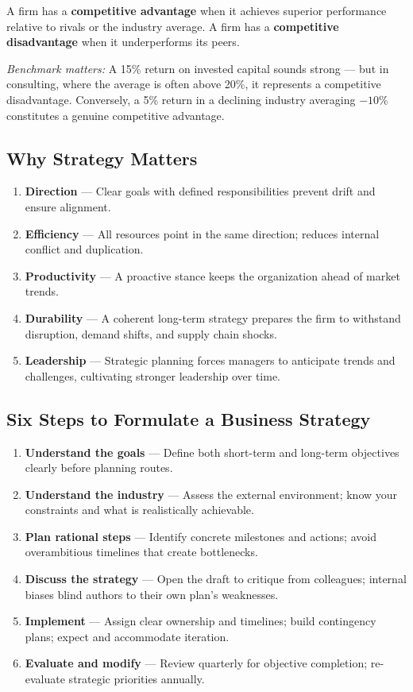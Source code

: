 \documentclass[11pt, letterpaper]{article}
\begin{document}
A firm has a \textbf{competitive advantage} when it achieves superior performance relative to rivals or the industry average. A firm has a \textbf{competitive disadvantage} when it underperforms its peers.

\textit{Benchmark matters:} A 15\% return on invested capital sounds strong --- but in consulting, where the average is often above 20\%, it represents a competitive disadvantage. Conversely, a 5\% return in a declining industry averaging $-10\%$ constitutes a genuine competitive advantage.

\subsection{Why Strategy Matters}

\begin{enumerate}[leftmargin=*, label=\textbf{\arabic*.}]
  \item \textbf{Direction} --- Clear goals with defined responsibilities prevent drift and ensure alignment.
  \item \textbf{Efficiency} --- All resources point in the same direction; reduces internal conflict and duplication.
  \item \textbf{Productivity} --- A proactive stance keeps the organization ahead of market trends.
  \item \textbf{Durability} --- A coherent long-term strategy prepares the firm to withstand disruption, demand shifts, and supply chain shocks.
  \item \textbf{Leadership} --- Strategic planning forces managers to anticipate trends and challenges, cultivating stronger leadership over time.
\end{enumerate}

\subsection{Six Steps to Formulate a Business Strategy}

\begin{enumerate}[leftmargin=*, label=\textbf{Step \arabic*.}]
  \item \textbf{Understand the goals} --- Define both short-term and long-term objectives clearly before planning routes.
  \item \textbf{Understand the industry} --- Assess the external environment; know your constraints and what is realistically achievable.
  \item \textbf{Plan rational steps} --- Identify concrete milestones and actions; avoid overambitious timelines that create bottlenecks.
  \item \textbf{Discuss the strategy} --- Open the draft to critique from colleagues; internal biases blind authors to their own plan's weaknesses.
  \item \textbf{Implement} --- Assign clear ownership and timelines; build contingency plans; expect and accommodate iteration.
  \item \textbf{Evaluate and modify} --- Review quarterly for objective completion; re-evaluate strategic priorities annually.
\end{enumerate}
\end{document}
